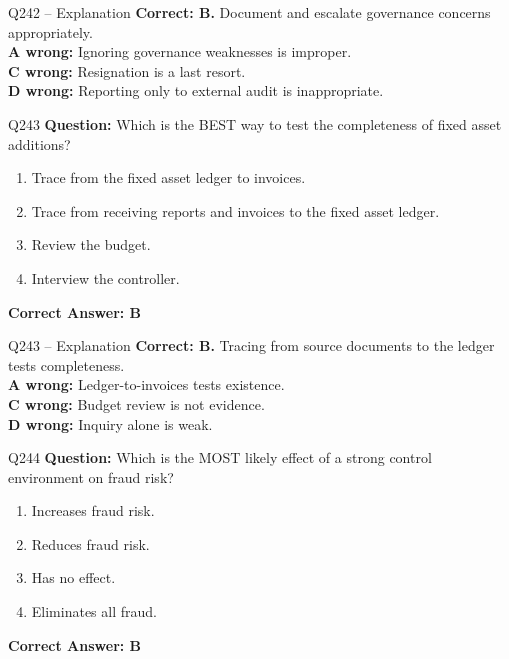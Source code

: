\documentclass[aspectratio=169,10pt]{beamer}
\begin{document}
	\begin{frame}[t]{Q242 -- Explanation}
		\small
		\textbf{Correct: B.} Document and escalate governance concerns appropriately. \\[4pt]
		\textbf{A wrong:} Ignoring governance weaknesses is improper. \\[2pt]
		\textbf{C wrong:} Resignation is a last resort. \\[2pt]
		\textbf{D wrong:} Reporting only to external audit is inappropriate.
	\end{frame}
	
	\begin{frame}[t]{Q243}
		\small
		\textbf{Question:} Which is the BEST way to test the completeness of fixed asset additions?
		\begin{enumerate}[label=\Alph*.,itemsep=1pt,topsep=2pt]
			\item Trace from the fixed asset ledger to invoices.
			\item Trace from receiving reports and invoices to the fixed asset ledger.
			\item Review the budget.
			\item Interview the controller.
		\end{enumerate}
		\vspace{4pt}
		\textbf{Correct Answer: B}
	\end{frame}
	
	\begin{frame}[t]{Q243 -- Explanation}
		\small
		\textbf{Correct: B.} Tracing from source documents to the ledger tests completeness. \\[4pt]
		\textbf{A wrong:} Ledger-to-invoices tests existence. \\[2pt]
		\textbf{C wrong:} Budget review is not evidence. \\[2pt]
		\textbf{D wrong:} Inquiry alone is weak.
	\end{frame}
	
	\begin{frame}[t]{Q244}
		\small
		\textbf{Question:} Which is the MOST likely effect of a strong control environment on fraud risk?
		\begin{enumerate}[label=\Alph*.,itemsep=1pt,topsep=2pt]
			\item Increases fraud risk.
			\item Reduces fraud risk.
			\item Has no effect.
			\item Eliminates all fraud.
		\end{enumerate}
		\vspace{4pt}
		\textbf{Correct Answer: B}
	\end{frame}
	
\end{document}
